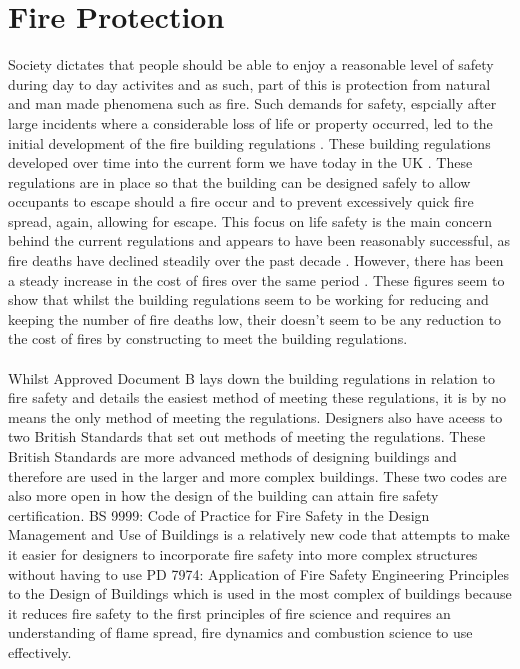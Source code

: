 \documentclass[table,a4paper,oneside]{book}
\begin{document}
\section{Fire Protection}
\label{sec:Fire_Protection}
Society dictates that people should be able to enjoy a reasonable level of safety during day to day activites and as such, part of this is protection from natural and man made phenomena such as fire. Such demands for safety, espcially after large incidents where a considerable loss of life or property occurred, led to the initial development of the fire building regulations \citep{Stollard1994}. These building regulations developed over time into the current form we have today in the UK \citep{Communities2006}. These regulations are in place so that the building can be designed safely to allow occupants to escape should a fire occur and to prevent excessively quick fire spread, again, allowing for escape. This focus on life safety is the main concern behind the current regulations and appears to have been reasonably successful, as fire deaths have declined steadily over the past decade \citep{DepartmentforCommunitiesandLocalGovernment2010}. However, there has been a steady increase in the cost of fires over the same period \citep{AssociationofBritishInsurers2009}. These figures seem to show that whilst the building regulations seem to be working for reducing and keeping the number of fire deaths low, their doesn't seem to be any reduction to the cost of fires by constructing to meet the building regulations.
\\
\\
Whilst Approved Document B lays down the building regulations in relation to fire safety and details the easiest method of meeting these regulations, it is by no means the only method of meeting the regulations. Designers also have aceess to two British Standards that set out methods of meeting the regulations. These British Standards are more advanced methods of designing buildings and therefore are used in the larger and more complex buildings. These two codes are also more open in how the design of the building can attain fire safety certification. BS 9999: Code of Practice for Fire Safety in the Design Management and Use of Buildings \citep{BSI2008} is a relatively new code that attempts to make it easier for designers to incorporate fire safety into more complex structures without having to use PD 7974: Application of Fire Safety Engineering Principles to the Design of Buildings \citep{BSI2003a} which is used in the most complex of buildings because it reduces fire safety to the first principles of fire science and requires an understanding of flame spread, fire dynamics and combustion science to use effectively.
\end{document}
